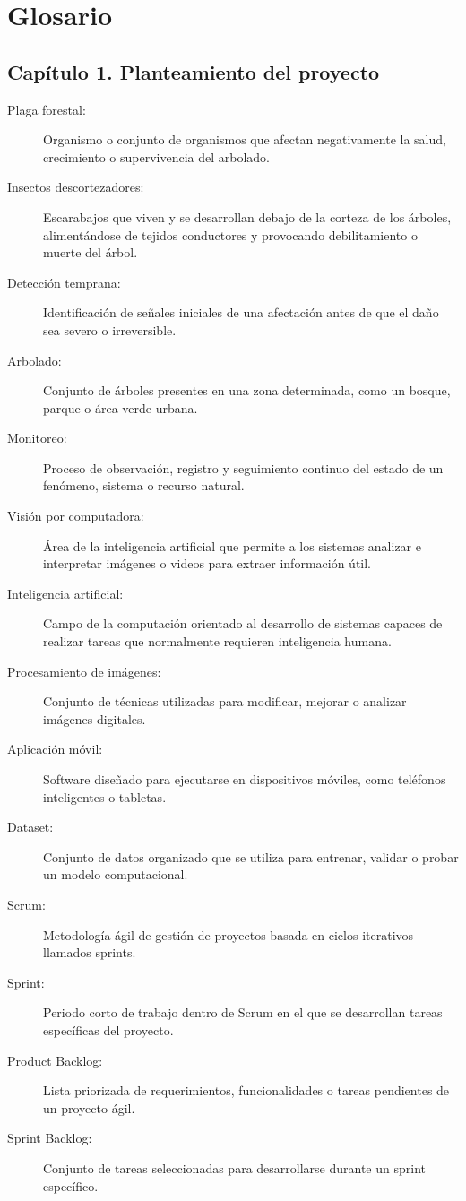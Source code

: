 \newpage
\section{Glosario}
\subsection*{Capítulo 1. Planteamiento del proyecto}
\begin{description}
    \item[Plaga forestal:] Organismo o conjunto de organismos que afectan negativamente la salud, crecimiento o supervivencia del arbolado.
    \item[Insectos descortezadores:] Escarabajos que viven y se desarrollan debajo de la corteza de los árboles, alimentándose de tejidos conductores y provocando debilitamiento o muerte del árbol.
    \item[Detección temprana:] Identificación de señales iniciales de una afectación antes de que el daño sea severo o irreversible.
    \item[Arbolado:] Conjunto de árboles presentes en una zona determinada, como un bosque, parque o área verde urbana.
    \item[Monitoreo:] Proceso de observación, registro y seguimiento continuo del estado de un fenómeno, sistema o recurso natural.
    \item[Visión por computadora:] Área de la inteligencia artificial que permite a los sistemas analizar e interpretar imágenes o videos para extraer información útil.
    \item[Inteligencia artificial:] Campo de la computación orientado al desarrollo de sistemas capaces de realizar tareas que normalmente requieren inteligencia humana.
    \item[Procesamiento de imágenes:] Conjunto de técnicas utilizadas para modificar, mejorar o analizar imágenes digitales.
    \item[Aplicación móvil:] Software diseñado para ejecutarse en dispositivos móviles, como teléfonos inteligentes o tabletas.
    \item[Dataset:] Conjunto de datos organizado que se utiliza para entrenar, validar o probar un modelo computacional.
    \item[Scrum:] Metodología ágil de gestión de proyectos basada en ciclos iterativos llamados sprints.
    \item[Sprint:] Periodo corto de trabajo dentro de Scrum en el que se desarrollan tareas específicas del proyecto.
    \item[Product Backlog:] Lista priorizada de requerimientos, funcionalidades o tareas pendientes de un proyecto ágil.
    \item[Sprint Backlog:] Conjunto de tareas seleccionadas para desarrollarse durante un sprint específico.
\end{description}
